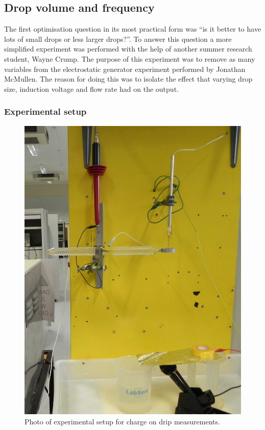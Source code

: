 \subsection*{Drop volume and frequency}

The first optimisation question in its most practical form was ``is it better to have lots of small drops or less larger drops?''.
To answer this question a more simplified experiment was performed with the help of another summer research student, Wayne Crump.
The purpose of this experiment was to remove as many variables from the electrostatic generator experiment performed by Jonathan McMullen.
The reason for doing this was to isolate the effect that varying drop size, induction voltage and flow rate had on the output.


 \subsubsection*{Experimental setup}

\begin{figure}
    \centering
    \includegraphics[scale=0.15]{content/appendices/chargedWaterDrops/graphics/Photo_dripperExperiment_Setup_draft.JPG}
    \caption{\label{Photo_dripperExperiment_Setup}Photo of experimental setup for charge on drip measurements.}
\end{figure}


